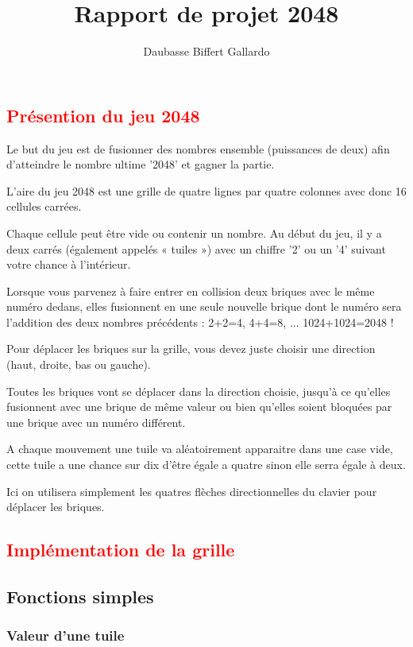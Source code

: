 \documentclass{article}
\title{Rapport de projet 2048}
\author{Daubasse Biffert Gallardo}
\begin{document}
\maketitle
\tableofcontents
\textcolor{red}{\section{Présention du jeu 2048}}

Le but du jeu est de fusionner des nombres ensemble (puissances de deux) afin d'atteindre le nombre ultime '2048' et gagner la partie.

L'aire du jeu 2048 est une grille de quatre lignes par quatre colonnes avec donc 16 cellules carrées.

Chaque cellule peut être vide ou contenir un nombre. Au début du jeu, il y a deux carrés (également appelés « tuiles ») avec un chiffre '2' ou un '4' suivant votre chance à l'intérieur. 

Lorsque vous parvenez à faire entrer en collision deux briques avec le même numéro dedans, elles fusionnent en une seule nouvelle brique dont le numéro sera l'addition des deux nombres précédents : 2+2=4, 4+4=8, ... 1024+1024=2048 !

Pour déplacer les briques sur la grille, vous devez juste choisir une direction (haut, droite, bas ou gauche).

Toutes les briques vont se déplacer dans la direction choisie, jusqu'à ce qu'elles fusionnent avec une brique de même valeur ou bien qu'elles soient bloquées par une brique avec un numéro différent.

A chaque mouvement une tuile va aléatoirement apparaitre dans une case vide, cette tuile a une chance sur dix d'être égale a quatre sinon elle serra égale à deux.

Ici on utilisera simplement les quatres flèches directionnelles du clavier pour déplacer les briques.

\textcolor{red}{\section{Implémentation de la grille}}

\subsection{Fonctions simples}

\subsubsection{Valeur d'une tuile}
\end{document}
